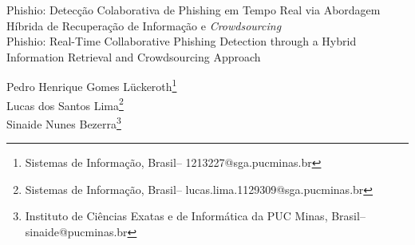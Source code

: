 \documentclass[a4paper,12pt]{article}
\makeatletter
\newcommand{\monog}{Phishio: Detecção Colaborativa de Phishing em Tempo Real via Abordagem Híbrida de Recuperação de Informação e \textit{Crowdsourcing}}
\newcommand{\monogES}{Phishio: Real-Time Collaborative Phishing Detection through a Hybrid Information Retrieval and Crowdsourcing Approach}
\newcommand{\origem}{Brasil}
\newcommand{\AutorA}{Pedro Henrique Gomes Lückeroth}
\newcommand{\funcaoA}{}
\newcommand{\cursA}{Sistemas de Informação}
\newcommand{\emailA}{1213227@sga.pucminas.br}
\newcommand{\AutorB}{Lucas dos Santos Lima}
\newcommand{\funcaoB}{}
\newcommand{\cursB}{Sistemas de Informação}
\newcommand{\emailB}{lucas.lima.1129309@sga.pucminas.br}
\newcommand{\AutorC}{Sinaide Nunes Bezerra}
\newcommand{\funcaoC}{}
\newcommand{\cursC}{Instituto de Ciências Exatas e de Informática da PUC Minas}
\newcommand{\emailC}{sinaide@pucminas.br}
\newcommand{\keyword}[1]{\textsf{#1}}
\makeatother
\begin{document}

\begin{flushleft}
\vspace{0cm} { %
\singlespacing \Large{\monog {} \\ }
\normalsize{\monogES}
}
\end{flushleft}

\begin{flushright}
\singlespacing 
\normalsize{\AutorA \footnote{\funcaoA \cursA, \origem -- \emailA }} \\

 \normalsize{\AutorB \footnote{\funcaoB \cursB, \origem -- \emailB }} \\
 
 \normalsize{\AutorC \footnote{\funcaoC \cursC, \origem -- \emailC }} \\
\end{flushright}
\thispagestyle{empty}

\begin{abstract}
\noindent
O \textit{phishing} persiste como uma das ameaças cibernéticas mais críticas ao explorar a confiança do usuário para o roubo de credenciais. As defesas tradicionais, baseadas em listas negras estáticas, são ineficazes contra a rápida rotatividade de URLs maliciosas em ataques \textit{zero-hour}. Este trabalho propõe o desenvolvimento de um sistema de detecção em tempo real, composto por uma extensão de navegador e uma API de análise em nuvem. A metodologia adota uma abordagem híbrida que combina técnicas de Recuperação de Informação em especial o Modelo Vetorial com ponderação TF-IDF e Similaridade do Cosseno aplicada a uma base de dados proprietária, integrada a um módulo de validação colaborativa (\textit{crowdsourcing}). A arquitetura utiliza o Google Compute Engine para o processamento vetorial intensivo e o Google Firestore para o gerenciamento dinâmico da reputação de URLs baseada no consenso da comunidade. A solução proposta visa reduzir a latência na identificação de novas ameaças e minimizar a taxa de falsos positivos através do \textit{feedback} contínuo dos usuários.
\\\textbf{\keyword{Palavras-chave: }} Phishing. Recuperação de Informação. Crowdsourcing. Segurança Web. Detecção em Tempo Real.
\end{abstract}
\end{document}
